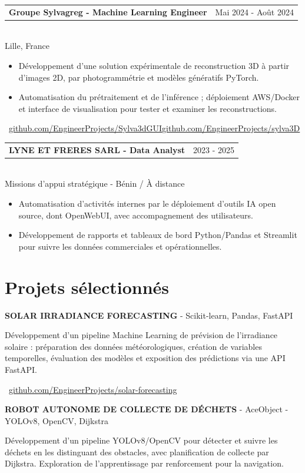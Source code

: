 \documentclass[10pt,a4paper]{article}
\makeatletter
\newcommand{\role}[3]{%
  \vspace{3pt}
  \begin{tabularx}{\linewidth}{@{}Xr@{}}
  \textbf{#1} & {\color{muted}#2}
  \end{tabularx}\vspace{0.8pt}\\
  {\color{muted}#3}\par
  \vspace{3pt}
}
\newcommand{\projectline}[2]{%
  \textbf{#1} - #2\par
}
\newcommand{\githublink}[2]{%
  \par{\footnotesize\color{accent}\faIcon{github}\ \href{#1}{#2}}\par
}
\newlength{\maincolumnheight}
\makeatother
\begin{document}
\begin{lrbox}{\maincolumnbox}
\begin{minipage}[t]{0.695\textwidth}
\vspace{8pt}
\role{Groupe Sylvagreg - Machine Learning Engineer}{Mai 2024 - Août 2024}{Lille, France}
\begin{itemize}
  \item Développement d'une solution expérimentale de reconstruction 3D à partir d'images 2D, par photogrammétrie et modèles génératifs PyTorch.
  \item Automatisation du prétraitement et de l'inférence ; déploiement AWS/Docker et interface de visualisation pour tester et examiner les reconstructions.
\end{itemize}
{\fontsize{7.5pt}{9pt}\selectfont\color{accent}\ \href{https://github.com/EngineerProjects/Sylva3dGUI}{github.com/EngineerProjects/Sylva3dGUI}\enspace\textbullet\enspace\href{https://github.com/EngineerProjects/sylva3D}{github.com/EngineerProjects/sylva3D}}\par

\vspace{8pt}
\role{LYNE ET FRERES SARL - Data Analyst}{2023 - 2025}{Missions d'appui stratégique - Bénin / À distance}
\begin{itemize}
  \item Automatisation d'activités internes par le déploiement d'outils IA open source, dont OpenWebUI, avec accompagnement des utilisateurs.
  \item Développement de rapports et tableaux de bord Python/Pandas et Streamlit pour suivre les données commerciales et opérationnelles.
\end{itemize}

\section{Projets sélectionnés}
\projectline{SOLAR IRRADIANCE FORECASTING}{Scikit-learn, Pandas, FastAPI}
Développement d'un pipeline Machine Learning de prévision de l'irradiance solaire : préparation des données météorologiques, création de variables temporelles, évaluation des modèles et exposition des prédictions via une API FastAPI.
\githublink{https://github.com/EngineerProjects/solar-forecasting}{github.com/EngineerProjects/solar-forecasting}

\vspace{8pt}
\projectline{ROBOT AUTONOME DE COLLECTE DE DÉCHETS}{AceObject - YOLOv8, OpenCV, Dijkstra}
Développement d'un pipeline YOLOv8/OpenCV pour détecter et suivre les déchets en les distinguant des obstacles, avec planification de collecte par Dijkstra. Exploration de l'apprentissage par renforcement pour la navigation.

\end{minipage}
\end{lrbox}
\setlength{\maincolumnheight}{\dimexpr\ht\maincolumnbox+\dp\maincolumnbox\relax}
\end{document}
